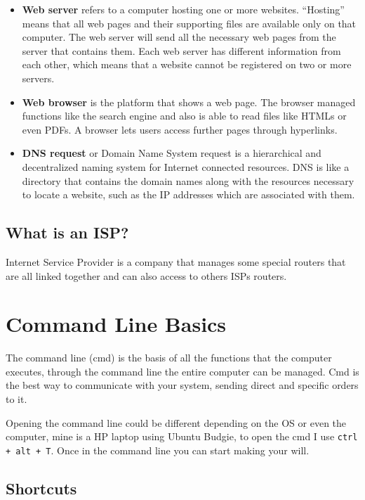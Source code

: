 \documentclass{article}
\begin{document}
\begin{itemize}
		\item \textbf{Web server} refers to a computer hosting one or more websites. ``Hosting'' means that all web pages and their supporting files are available only on that computer. The web server will send all the necessary web pages from the server that contains them. Each web server has different information from each other, which means that a website cannot be registered on two or more servers.
		
		\item \textbf{Web browser} is the platform that shows a web page. The browser managed functions like the search engine and also is able to read files like HTMLs or even PDFs. A browser lets users access further pages through hyperlinks.
		
		\item \textbf{DNS request} or Domain Name System request is a hierarchical and decentralized naming system for Internet connected resources. DNS is like a directory that contains the domain names along with the resources necessary to locate a website, such as the IP addresses which are associated with them.
	\end{itemize}
    
    \subsection{What is an ISP?}
    
    Internet Service Provider is a company that manages some special routers that are all linked together and can also access to others ISPs routers.
    
    \section{Command Line Basics}
    
    The command line (cmd) is the basis of all the functions that the computer executes, through the command line the entire computer can be managed. Cmd is the best way to communicate with your system, sending direct and specific orders to it.\par
    Opening the command line could be different depending on the OS or even the computer, mine is a HP laptop using Ubuntu Budgie, to open the cmd I use {\tt ctrl + alt + T}. Once in the command line you can start making your will.
    
    \subsection{Shortcuts}
    
\end{document}

